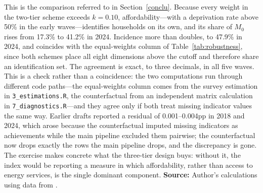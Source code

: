 \documentclass[11pt, a4paper]{article}
\begin{document}
\begin{table}[htb]
\begin{justify}
\noindent This is the comparison referred to in Section~\ref{conclu}. Because every weight in the two-tier scheme exceeds $k=0.10$, affordability---with a deprivation rate above 50\% in the early waves---identifies households on its own, and its share of $M_0$ rises from 17.3\% to 41.2\% in 2024. Incidence more than doubles, to 47.9\% in 2024, and coincides with the equal-weights column of Table~\ref{tab:robustness}, since both schemes place all eight dimensions above the cutoff and therefore share an identification set. The agreement is exact, to three decimals, in all five waves. This is a check rather than a coincidence: the two computations run through different code paths---the equal-weights column comes from the survey estimation in \texttt{3\_estimations.R}, the counterfactual from an independent matrix calculation in \texttt{7\_diagnostics.R}---and they agree only if both treat missing indicator values the same way. Earlier drafts reported a residual of 0.001--0.004pp in 2018 and 2024, which arose because the counterfactual imputed missing indicators as achievements while the main pipeline excluded them pairwise; the counterfactual now drops exactly the rows the main pipeline drops, and the discrepancy is gone. The exercise makes concrete what the three-tier design buys: without it, the index would be reporting a measure in which affordability, rather than access to energy services, is the single dominant component. \textbf{Source:} Author's calculations using data from \textcite{enigh2016, enigh2018, enigh2020, enigh2022, enigh2024}.
\end{justify}
\label{tab:twotier}
\end{table}
\end{document}
